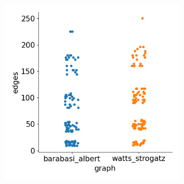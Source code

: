 \begin{figure}[H]
\begin{subfigure}{0.45\textwidth}
        \includegraphics[width=\linewidth]{images/results/random/lstm/graph_edges.png}
        \caption{} \label{fig:lstm_graph_edges}
    \end{subfigure}%
  

\end{figure}
